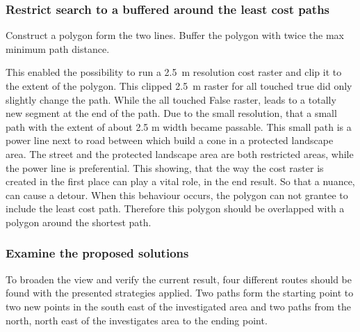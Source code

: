\subsubsection{Restrict search to a buffered around the least cost paths}

Construct a polygon form the two lines.
Buffer the polygon with twice the max minimum path distance.


This enabled the possibility  to run a 2.5~m resolution cost raster and clip it to the extent of the polygon. 
This clipped 2.5~m raster for all touched true did only slightly change the path. 
While the all touched False raster, leads to a totally new segment at the end of the path. 
Due to the small resolution, that a small path with the extent of about 2.5 m width became passable.
This small path is a power line next to road between which build a cone in a protected landscape area.
The street and the protected landscape area are both restricted areas, while the power line is preferential.
This showing, that the way the cost raster is created in the first place can play a vital role, in the end result.
So that a nuance, can cause a detour.
When this behaviour occurs, the polygon can not grantee to include the least cost path.
Therefore this polygon should be overlapped with a polygon around the shortest path.



\subsubsection{Examine the proposed solutions}
To broaden the view and verify the current result, four different routes should be found with the presented strategies applied.
Two paths form the starting point to two new points in the south east of the investigated area and two paths from the north, north east of the investigates area to the ending point.


